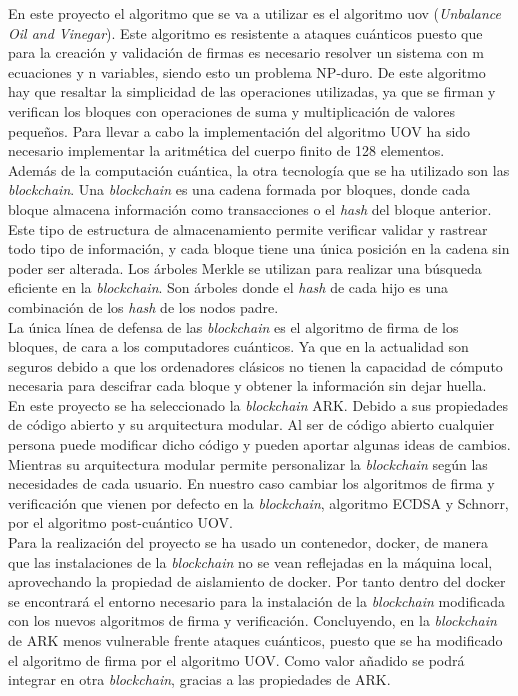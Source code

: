 En este proyecto el algoritmo que se va a utilizar es el algoritmo \acrshort{uov} (\textit{Unbalance Oil and Vinegar}). Este algoritmo es resistente a ataques cuánticos puesto que para la creación y validación de firmas es necesario resolver un sistema con m ecuaciones y n variables, siendo esto un problema NP-duro. De este algoritmo hay que resaltar la simplicidad de las operaciones utilizadas, ya que se firman y verifican los bloques con operaciones de suma y multiplicación de valores pequeños. Para llevar a cabo la implementación del algoritmo UOV ha sido necesario implementar la aritmética del cuerpo finito de 128 elementos.\\

Además de la computación cuántica, la otra tecnología que se ha utilizado son las \textit{blockchain}. Una \textit{blockchain} es una cadena formada por bloques, donde cada bloque almacena información como transacciones o el \textit{hash} del bloque anterior. Este tipo de estructura de almacenamiento permite verificar validar y rastrear todo tipo de información, y cada bloque tiene una única posición en la cadena sin poder ser alterada. Los árboles Merkle se utilizan para realizar una búsqueda eficiente en la \textit{blockchain}. Son árboles donde el \textit{hash} de cada hijo es una combinación de los \textit{hash} de los nodos padre.\\

La única línea de defensa de las \textit{blockchain} es el algoritmo de firma de los bloques, de cara a los computadores cuánticos. Ya que en la actualidad son seguros debido a que los ordenadores clásicos no tienen la capacidad de cómputo necesaria para descifrar cada bloque y obtener la información sin dejar huella.\\

En este proyecto se ha seleccionado la \textit{blockchain} ARK. Debido a sus propiedades de código abierto y su arquitectura modular. Al ser de código abierto cualquier persona puede modificar dicho código y pueden aportar algunas ideas de cambios. Mientras su arquitectura modular permite personalizar la \textit{blockchain} según las necesidades de cada usuario. En nuestro caso cambiar los algoritmos de firma y verificación que vienen por defecto en la \textit{blockchain}, algoritmo ECDSA y Schnorr, por el algoritmo post-cuántico UOV.\\

Para la realización del proyecto se ha usado un contenedor, docker, de manera que las instalaciones de la \textit{blockchain} no se vean reflejadas en la máquina local, aprovechando la propiedad de aislamiento de docker. Por tanto dentro del docker se encontrará el entorno necesario para la instalación de la \textit{blockchain} modificada con los nuevos algoritmos de firma y verificación. Concluyendo, en la \textit{blockchain} de ARK  menos vulnerable frente ataques cuánticos, puesto que se ha modificado el algoritmo de firma por el algoritmo UOV. Como valor añadido se podrá integrar en otra \textit{blockchain}, gracias a las propiedades de ARK.\\

